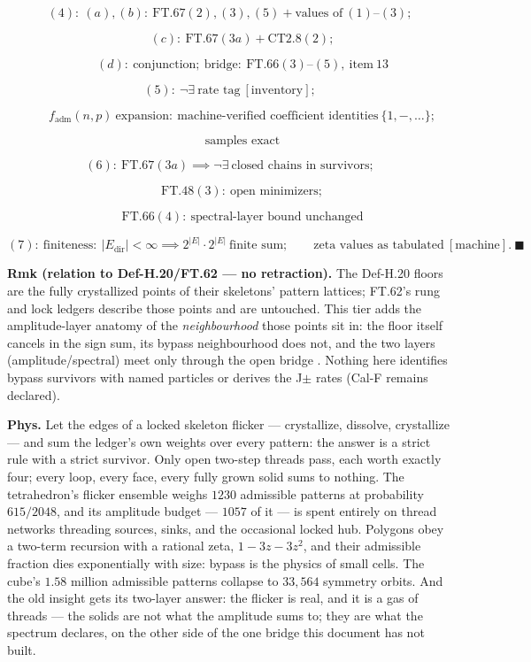 \begin{theorem}
\[
(4):\ (a),(b):\ \mathrm{FT.67}(2),(3),(5)+\text{values of}\ (1)\text{--}(3);
\]

\[
\qquad (c):\ \mathrm{FT.67}(3a)+\mathrm{CT2.8}(2);
\]

\[
\qquad (d):\ \text{conjunction};\ \text{bridge}:\ \mathrm{FT.66}(3)\text{--}(5),\ \text{item}\ 13
\]

\[
(5):\ \neg\exists\ \text{rate tag}\ [\text{inventory}];
\]

\[
\qquad f_{\mathrm{adm}}(n,p)\ \text{expansion}:\ \text{machine-verified coefficient identities}\ \{1,-,\dots\};
\]

\[
\qquad \text{samples exact}
\]

\[
(6):\ \mathrm{FT.67}(3a)\implies\neg\exists\ \text{closed chains in survivors};
\]

\[
\qquad \mathrm{FT.48}(3):\ \text{open minimizers};
\]

\[
\qquad \mathrm{FT.66}(4):\ \text{spectral-layer bound unchanged}
\]

\[
(7):\ \text{finiteness}:\ |E_{\mathrm{dir}}|<\infty\implies2^{|E|}\cdot2^{|E|}\ \text{finite sum};\qquad\text{zeta values as tabulated}\ [\text{machine}].\ \blacksquare
\]

\textbf{Rmk (relation to Def-H.20/FT.62 — no retraction).} The Def-H.20 floors are the fully crystallized points of their skeletons' pattern lattices; FT.62's rung and lock ledgers describe those points and are untouched. This tier adds the amplitude-layer anatomy of the \textit{neighbourhood} those points sit in: the floor itself cancels in the sign sum, its bypass neighbourhood does not, and the two layers (amplitude/spectral) meet only through the open bridge . Nothing here identifies bypass survivors with named particles  or derives the J$\pm$ rates (Cal-F remains declared).

\textbf{Phys.} Let the edges of a locked skeleton flicker — crystallize, dissolve, crystallize — and sum the ledger's own weights over every pattern: the answer is a strict rule with a strict survivor. Only open two-step threads pass, each worth exactly four; every loop, every face, every fully grown solid sums to nothing. The tetrahedron's flicker ensemble weighs $1230$ admissible patterns at probability $615/2048$, and its amplitude budget — $1057$ of it — is spent entirely on thread networks threading sources, sinks, and the occasional locked hub. Polygons obey a two-term recursion with a rational zeta, $1-3z-3z^2$, and their admissible fraction dies exponentially with size: bypass is the physics of small cells. The cube's $1.58$ million admissible patterns collapse to $33{,}564$ symmetry orbits. And the old insight gets its two-layer answer: the flicker is real, and it is a gas of threads — the solids are not what the amplitude sums to; they are what the spectrum declares, on the other side of the one bridge this document has not built.


\end{theorem}
